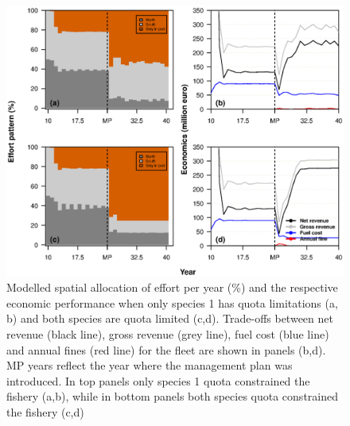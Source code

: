\documentclass[12pt,oneline,a4paper,numbib]{ouparticle}
\numberwithin{equation}{subsection} %
\begin{document}
\begin{figure}[!ht]
\centering
\includegraphics[width=\textwidth]{Figures/Efforteconomics.eps} 
\caption{Modelled spatial allocation of effort per year (\%) and the respective economic performance when only species 1 has quota limitations (a, b) and both species are quota limited (c,d). Trade-offs between net revenue (black line), gross revenue (grey line), fuel cost (blue line) and annual fines (red line) for the fleet are shown in panels (b,d). MP years reflect the year where the management plan was introduced. In top panels only species 1 quota constrained the fishery (a,b), while in bottom panels both species quota constrained the fishery (c,d)}
\end{figure}
\end{document}
